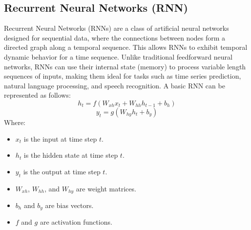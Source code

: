 \documentclass{ieeeojies}
\begin{document}
\subsection{Recurrent Neural Networks (RNN)}
Recurrent Neural Networks (RNNs) are a class of artificial neural networks designed for sequential data, where the connections between nodes form a directed graph along a temporal sequence. This allows RNNs to exhibit temporal dynamic behavior for a time sequence. Unlike traditional feedforward neural networks, RNNs can use their internal state (memory) to process variable length sequences of inputs, making them ideal for tasks such as time series prediction, natural language processing, and speech recognition.
A basic RNN can be represented as follows:
\begin{dmath*}
    h_t = f(W_{xh} x_t + W_{hh} h_{t-1} + b_h)
\end{dmath*}
\begin{dmath*}
    y_t = g(W_{hy} h_t + b_y)
\end{dmath*}
Where:\begin {itemize}
    \item \(x_t\) is the input at time step \(t\).
    \item \(h_t\) is the hidden state at time step \(t\).
    \item \(y_t\) is the output at time step \(t\).
    \item \(W_{xh}\), \(W_{hh}\), and \(W_{hy}\) are weight matrices.
    \item \(b_h\) and \(b_y\) are bias vectors.
    \item \(f\) and \(g\) are activation functions.
\end{itemize}
\end{document}
